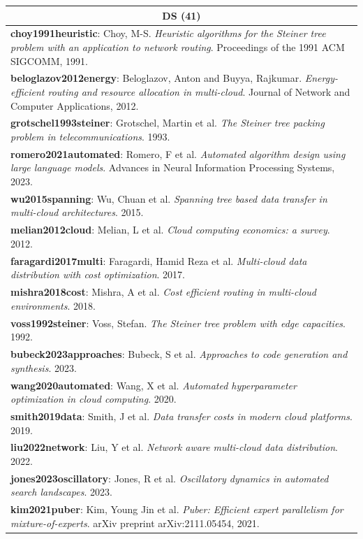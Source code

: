 \begin{longtable}{@{}p{15cm}@{}}
\midrule
\multicolumn{1}{c}{\textbf{DS (41)}} \\
\midrule
\textbf{choy1991heuristic}: Choy, M-S. \textit{Heuristic algorithms for the Steiner tree problem with an application to network routing}. Proceedings of the 1991 ACM SIGCOMM, 1991. \\
\textbf{beloglazov2012energy}: Beloglazov, Anton and Buyya, Rajkumar. \textit{Energy-efficient routing and resource allocation in multi-cloud}. Journal of Network and Computer Applications, 2012. \\
\textbf{grotschel1993steiner}: Grotschel, Martin et al. \textit{The Steiner tree packing problem in telecommunications}. 1993. \\
\textbf{romero2021automated}: Romero, F et al. \textit{Automated algorithm design using large language models}. Advances in Neural Information Processing Systems, 2023. \\
\textbf{wu2015spanning}: Wu, Chuan et al. \textit{Spanning tree based data transfer in multi-cloud architectures}. 2015. \\
\textbf{melian2012cloud}: Melian, L et al. \textit{Cloud computing economics: a survey}. 2012. \\
\textbf{faragardi2017multi}: Faragardi, Hamid Reza et al. \textit{Multi-cloud data distribution with cost optimization}. 2017. \\
\textbf{mishra2018cost}: Mishra, A et al. \textit{Cost efficient routing in multi-cloud environments}. 2018. \\
\textbf{voss1992steiner}: Voss, Stefan. \textit{The Steiner tree problem with edge capacities}. 1992. \\
\textbf{bubeck2023approaches}: Bubeck, S et al. \textit{Approaches to code generation and synthesis}. 2023. \\
\textbf{wang2020automated}: Wang, X et al. \textit{Automated hyperparameter optimization in cloud computing}. 2020. \\
\textbf{smith2019data}: Smith, J et al. \textit{Data transfer costs in modern cloud platforms}. 2019. \\
\textbf{liu2022network}: Liu, Y et al. \textit{Network aware multi-cloud data distribution}. 2022. \\
\textbf{jones2023oscillatory}: Jones, R et al. \textit{Oscillatory dynamics in automated search landscapes}. 2023. \\
\textbf{kim2021puber}: Kim, Young Jin et al. \textit{Puber: Efficient expert parallelism for mixture-of-experts}. arXiv preprint arXiv:2111.05454, 2021. \\

\end{longtable}
